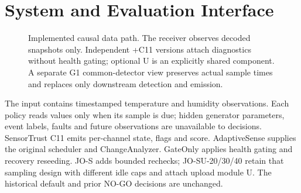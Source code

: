 \documentclass[10pt]{article}
\begin{document}
\section{System and Evaluation Interface}
\begin{figure}[tbp]\centering
{}
\caption{Implemented causal data path. The receiver observes decoded snapshots only. Independent +C11 versions attach diagnostics without health gating; optional U is an explicitly shared component. A separate G1 common-detector view preserves actual sample times and replaces only downstream detection and emission.}
\label{fig:architecture}
\end{figure}

The input contains timestamped temperature and humidity observations. Each policy reads values only when its sample is due; hidden generator parameters, event labels, faults and future observations are unavailable to decisions. SensorTrust C11 emits per-channel state, flags and score. AdaptiveSense supplies the original scheduler and ChangeAnalyzer. GateOnly applies health gating and recovery reseeding. JO-S adds bounded rechecks; JO-SU-20/30/40 retain that sampling design with different idle caps and attach upload module U. The historical default and prior NO-GO decisions are unchanged.
\end{document}
